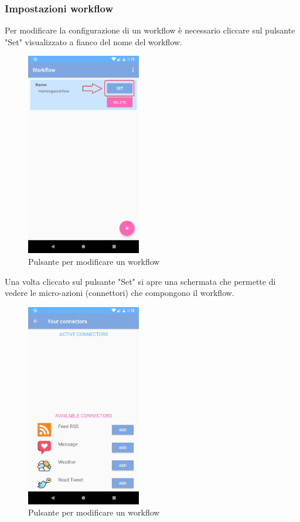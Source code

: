 \subsubsection{Impostazioni workflow}
\label{sec:sec_impostazioni_workflow}
Per modificare la configurazione di un workflow è necessario cliccare sul pulsante "Set" visualizzato a fianco del nome del workflow.
\begin{figure}[H]
	\centering
	\includegraphics[width=5cm]{../includes/pics/set_button_workflow.png}
	\caption{\label{fig:set_button_workflow}Pulsante per modificare un workflow}
\end{figure}
Una volta cliccato sul pulsante "Set" si apre una schermata che permette di vedere le micro-azioni (connettori) che compongono il workflow.
\begin{figure}[H]
	\centering
	\includegraphics[width=5cm]{../includes/pics/edit_workflow.png}
	\caption{\label{fig:edit_workflow}Pulsante per modificare un workflow}
\end{figure}
